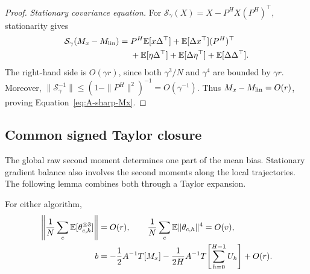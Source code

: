 \begin{proof}
\emph{Stationary covariance equation.}
For $\mathcal S_\gamma(X)=X-P^HX(P^H)^\top$, stationarity gives
\begin{align}
\label{eq:A-second-moment-difference}
 \mathcal S_\gamma(M_x-M_{\rm lin})
 ={}&P^H\mathbb{E}[x\Delta^\top]+\mathbb{E}[\Delta x^\top](P^H)^\top\notag\\
 &+\mathbb{E}[\eta\Delta^\top]+\mathbb{E}[\Delta\eta^\top]+\mathbb{E}[\Delta\Delta^\top].
\end{align}
The right-hand side is $O(\gamma r)$, since both $\gamma^3/N$ and
$\gamma^4$ are bounded by $\gamma r$. Moreover,
$\|\mathcal S_\gamma^{-1}\|\le(1-\|P^H\|^2)^{-1}=O(\gamma^{-1})$.
Thus $M_x-M_{\rm lin}=O(r)$, proving Equation~\eqref{eq:A-sharp-Mx}.
\end{proof}

\subsection{Common signed Taylor closure}
\label{app:common-taylor}

The global raw second moment determines one part of the mean bias. Stationary
gradient balance also involves the second moments along the local
trajectories. The following lemma combines both through a Taylor expansion.

\begin{lemma}
\label{lem:common-taylor}
For either algorithm,
\begin{align}
 \left\|\frac1N\sum_c\mathbb{E}[\theta_{c,h}^{\otimes3}]\right\|&=O(r),\qquad
 \frac1N\sum_c\mathbb{E}\|\theta_{c,h}\|^4=O(v),
 \label{eq:A-local-moments}\\
 b&=-\frac12A^{-1}T[M_x]
     -\frac1{2H}A^{-1}T\!\left[\sum_{h=0}^{H-1}U_h\right]+O(r).
 \label{eq:A-master}
\end{align}
\end{lemma}

